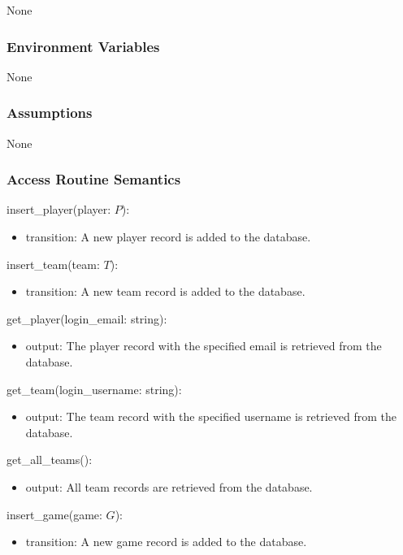 \documentclass[12pt, titlepage]{article}
\begin{document}
None

\subsubsection{Environment Variables}

None

\subsubsection{Assumptions}


None

\subsubsection{Access Routine Semantics}

\noindent insert\_player(player: $P$):
\begin{itemize}
\item transition: A new player record is added to the database.
\end{itemize}

\noindent insert\_team(team: $T$):
\begin{itemize}
\item transition: A new team record is added to the database.
\end{itemize}

\noindent get\_player(login\_email: string):
\begin{itemize}
\item output: The player record with the specified email is retrieved from the database.
\end{itemize}

\noindent get\_team(login\_username: string):
\begin{itemize}
\item output: The team record with the specified username is retrieved from the database.
\end{itemize}

\noindent get\_all\_teams():
\begin{itemize}
\item output: All team records are retrieved from the database.
\end{itemize}

\noindent insert\_game(game: $G$):
\begin{itemize}
\item transition: A new game record is added to the database.
\end{itemize}
\end{document}
